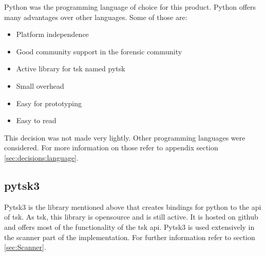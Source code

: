 Python was the programming language of choice for this product. Python offers many advantages over other languages. Some of those are:

\begin{itemize}
    \item Platform independence
    \item Good community support in the forensic community
    \item Active library for \gls{tsk} named \gls{pytsk}
    \item Small overhead
    \item Easy for prototyping
    \item Easy to read
\end{itemize}

This decision was not made very lightly. Other programming languages were considered. For more information on those refer to appendix section \ref{sec:decisions:language}.

\subsection{pytsk3}
\label{sec:pytsk3}

Pytsk3 is the library mentioned above that creates bindings for python to the \gls{api} of \gls{tsk}. As \gls{tsk}, this library is \gls{opensource} and is still active. It is hosted on \gls{github} and offers most of the functionality of the \gls{tsk} \gls{api}. Pytsk3 is used extensively in the scanner part of the implementation. For further information refer to section \ref{sec:Scanner}.
